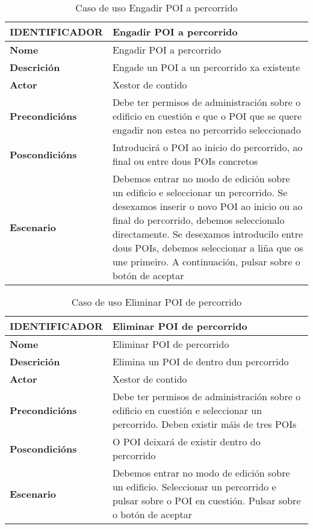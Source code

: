 \begin{table}[tbp]
	\begin{tabular}{|l|p{10cm}|}
		\hline 
		\textbf{IDENTIFICADOR}	& \textbf{Engadir POI a percorrido} \\ 
		\hline 
		\textbf{Nome} & Engadir POI a percorrido \\ 
		\hline 
		\textbf{Descrición} & Engade un POI a un percorrido xa existente \\ 
		\hline 
		\textbf{Actor} & Xestor de contido \\ 
		\hline 
		\textbf{Precondicións} & Debe ter permisos de administración sobre o edificio en cuestión e que o POI que se quere engadir non estea no percorrido seleccionado \\ 
		\hline 
		\textbf{Poscondicións} & Introducirá o POI ao inicio do percorrido, ao final ou entre dous POIs concretos \\ 
		\hline 
		\textbf{Escenario} & Debemos entrar no modo de edición sobre un edificio e seleccionar un percorrido. Se desexamos inserir o novo POI ao inicio ou ao final do percorrido, debemos seleccionalo directamente. Se desexamos introducilo entre dous POIs, debemos seleccionar a liña que os une primeiro. A continuación, pulsar sobre o botón de aceptar \\ 
		\hline 
	\end{tabular}
	\caption{Caso de uso Engadir POI a percorrido}
	\label{tab:cuEngadirPOIPercorrido}
\end{table}

\begin{table}[tbp]
	\begin{tabular}{|l|p{10cm}|}
		\hline 
		\textbf{IDENTIFICADOR}	& \textbf{Eliminar POI de percorrido} \\ 
		\hline 
		\textbf{Nome} & Eliminar POI de percorrido \\ 
		\hline 
		\textbf{Descrición} & Elimina un POI de dentro dun percorrido \\ 
		\hline 
		\textbf{Actor} & Xestor de contido \\ 
		\hline 
		\textbf{Precondicións} & Debe ter permisos de administración sobre o edificio en cuestión e seleccionar un percorrido. Deben existir máis de tres POIs \\ 
		\hline 
		\textbf{Poscondicións} & O POI deixará de existir dentro do percorrido \\ 
		\hline 
		\textbf{Escenario} & Debemos entrar no modo de edición sobre un edificio. Seleccionar un percorrido e pulsar sobre o POI en cuestión. Pulsar sobre o botón de aceptar \\ 
		\hline 
	\end{tabular}
	\caption{Caso de uso Eliminar POI de percorrido}
	\label{tab:cuEliminarPOIPercorrido}
\end{table}

